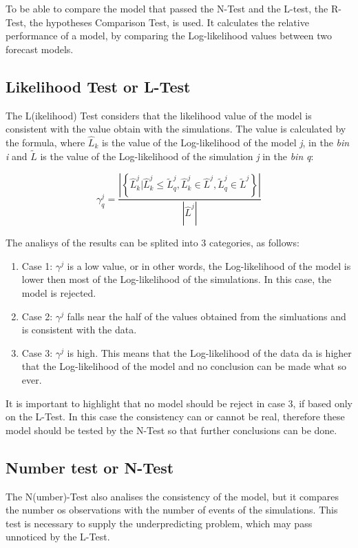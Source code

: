 To be able to compare the model that passed the N-Test and the L-test,
the R-Test, the hypotheses Comparison Test, is used. It calculates the
relative performance of a model, by comparing the Log-likelihood
values between two forecast models.

\subsection{Likelihood Test or L-Test}
 
The L(ikelihood) Test considers that the likelihood value of the model
is consistent with the value obtain with the simulations. The value is
calculated by the formula, where $\widehat{L}_k$ is the value of the
Log-likelihood of the model {\it j}, in the {\it bin} {\it i} and
$\widetilde{L}$ is the value of the Log-likelihood of the simulation
{\it j} in the {\it bin} {\it q}:


\begin{equation}
\gamma^{j}_{q} = \frac{\left| \left\{ \widehat{L}^j_k | \widehat{L}^j_k \leq \widetilde{L}^j_q, \widehat{L}^j_k \in \widehat{L}^j, \widetilde{L}^j_q \in \widetilde{L}^j  \right\} \right|}  {|\widehat{L}^j|}
\end{equation}

The analisys of the results can be splited into 3 categories, as follows:

\begin{enumerate}
\item Case 1: $\gamma^{j}$ is a low value, or in other words, the
  Log-likelihood of the model is lower then most of the Log-likelihood
  of the simulations. In this case, the model is rejected.
\item Case 2: $\gamma^{j}$ falls near the half of the values obtained
  from the simluations and is consistent with the data.
\item Case 3: $\gamma^{j}$ is high. This means that the Log-likelihood
  of the data da is higher that the Log-likelihood of the model and no
  conclusion can be made what so ever.
\end{enumerate}


It is important to highlight that no model should be reject in case 3,
if based only on the L-Test. In this case the consistency can or
cannot be real, therefore these model should be tested by the N-Test
so that further conclusions can be done.

\subsection{Number test or N-Test}
The N(umber)-Test also analises the consistency of the model, but it
compares the number os observations with the number of events of the
simulations. This test is necessary to supply the underpredicting
problem, which may pass unnoticed by the L-Test.

